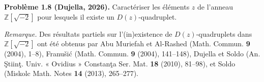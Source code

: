 \textbf{Problème 1.8 (Dujella, 2026).} Caractériser les éléments $z$ de l'anneau $\mathbb{Z}[\sqrt{-2}]$ pour lesquels il existe un $D(z)$-quadruplet.

\medskip

\textit{Remarque.} Des résultats partiels sur l'(in)existence de $D(z)$-quadruplets dans $\mathbb{Z}[\sqrt{-2}]$ ont été obtenus par Abu Muriefah et Al-Rashed (Math. Commun. \textbf{9} (2004), 1--8), Franušić (Math. Commun. \textbf{9} (2004), 141--148), Dujella et Soldo (An. Ştiinţ. Univ. « Ovidius » Constanţa Ser. Mat. \textbf{18} (2010), 81--98), et Soldo (Miskolc Math. Notes \textbf{14} (2013), 265--277).
